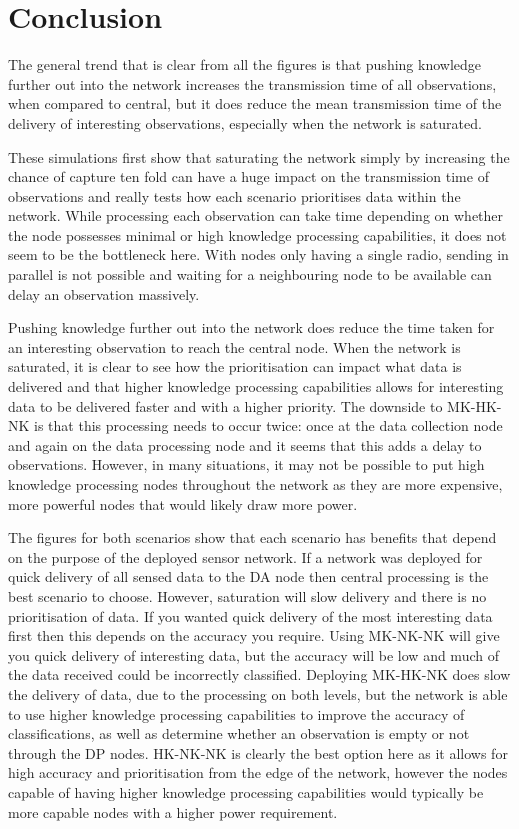 \section{Conclusion}\label{sim:conc}
The general trend that is clear from all the figures is that pushing knowledge further out into the network increases the transmission time of all observations, when compared to central, but it does reduce the mean transmission time of the delivery of interesting observations, especially when the network is saturated.

These simulations first show that saturating the network simply by increasing the chance of capture ten fold can have a huge impact on the transmission time of observations and really tests how each scenario prioritises data within the network. While processing each observation can take time depending on whether the node possesses minimal or high knowledge processing capabilities, it does not seem to be the bottleneck here. With nodes only having a single radio, sending in parallel is not possible and waiting for a neighbouring node to be available can delay an observation massively.

Pushing knowledge further out into the network does reduce the time taken for an interesting observation to reach the central node. When the network is saturated, it is clear to see how the prioritisation can impact what data is delivered and that higher knowledge processing capabilities allows for interesting data to be delivered faster and with a higher priority. The downside to MK-HK-NK is that this processing needs to occur twice: once at the data collection node and again on the data processing node and it seems that this adds a delay to observations. However, in many situations, it may not be possible to put high knowledge processing nodes throughout the network as they are more expensive, more powerful nodes that would likely draw more power.

The figures for both scenarios show that each scenario has benefits that depend on the purpose of the deployed sensor network. If a network was deployed for quick delivery of all sensed data to the DA node then central processing is the best scenario to choose. However, saturation will slow delivery and there is no prioritisation of data. If you wanted quick delivery of the most interesting data first then this depends on the accuracy you require. Using MK-NK-NK will give you quick delivery of interesting data, but the accuracy will be low and much of the data received could be incorrectly classified. Deploying MK-HK-NK does slow the delivery of data, due to the processing on both levels, but the network is able to use higher knowledge processing capabilities to improve the accuracy of classifications, as well as determine whether an observation is empty or not through the DP nodes. HK-NK-NK is clearly the best option here as it allows for high accuracy and prioritisation from the edge of the network, however the nodes capable of having higher knowledge processing capabilities would typically be more capable nodes with a higher power requirement.



